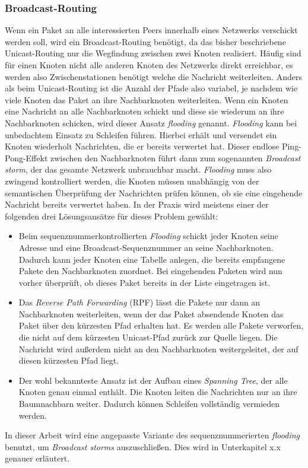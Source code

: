 \subsubsection{Broadcast-Routing}
Wenn ein Paket an alle interessierten Peers innerhalb eines Netzwerks verschickt werden soll, wird ein Broadcast-Routing benötigt, da das bisher beschriebene Unicast-Routing nur die Wegfindung zwischen zwei Knoten realisiert. Häufig sind für einen Knoten nicht alle anderen Knoten des Netzwerks direkt erreichbar, es werden also Zwischenstationen benötigt welche die Nachricht weiterleiten. Anders als beim Unicast-Routing ist die Anzahl der Pfade also variabel, je nachdem wie viele Knoten das Paket an ihre Nachbarknoten weiterleiten. Wenn ein Knoten eine Nachricht an alle Nachbarknoten schickt und diese sie wiederum an ihre Nachbarknoten schicken, wird dieser Ansatz \textit{flooding} genannt. \textit{Flooding} kann bei unbedachtem Einsatz zu Schleifen führen. Hierbei erhält und versendet ein Knoten wiederholt Nachrichten, die er bereits verwertet hat. Dieser endlose Ping-Pong-Effekt zwischen den Nachbarknoten führt dann zum sogenannten \textit{Broadcast storm}, der das gesamte Netzwerk unbrauchbar macht. \textit{Flooding} muss also zwingend kontrolliert werden, die Knoten müssen unabhängig von der semantischen Überprüfung der Nachrichten prüfen können, ob sie eine eingehende Nachricht bereits verwertet haben. In der Praxis wird meistens einer der folgenden drei Lösungsansätze für dieses Problem gewählt:
\begin{itemize}
	\item Beim sequenznummerkontrollierten \textit{Flooding} schickt jeder Knoten seine Adresse und eine Broadcast-Sequenznummer an seine Nachbarknoten. Dadurch kann jeder Knoten eine Tabelle anlegen, die bereits empfangene Pakete den Nachbarknoten zuordnet. Bei eingehenden Paketen wird nun vorher überprüft, ob dieses Paket bereits in der Liste eingetragen ist. 
	\item Das \textit{Reverse Path Forwarding} (RPF) lässt die Pakete nur dann an Nachbarknoten weiterleiten, wenn der das Paket absendende Knoten das Paket über den kürzesten Pfad erhalten hat. Es werden alle Pakete verworfen, die nicht auf dem kürzesten Unicast-Pfad zurück zur Quelle liegen. Die Nachricht wird außerdem nicht an den Nachbarknoten weitergeleitet, der auf diesen kürzesten Pfad liegt. 
	\item Der wohl bekannteste Ansatz ist der Aufbau eines \textit{Spanning Tree}, der alle Knoten genau einmal enthält. Die Knoten leiten die Nachrichten nur an ihre Baumnachbarn weiter. Dadurch können Schleifen vollständig vermieden werden.
\end{itemize}
In dieser Arbeit wird eine angepasste Variante des sequenznummerierten \textit{flooding} benutzt, um \textit{Broadcast storms} auszuschließen. Dies wird in Unterkapitel x.x genauer erläutert.

